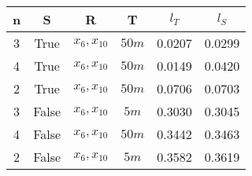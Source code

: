 \begin{tabular}{| c c | c c | c c |}
\hline
n & S & R & T & $l_T$ & $l_S$ \\
\hline
3 & True & $x_{6}, x_{10}$ & $50m$ & 0.0207 & 0.0299 \\
4 & True & $x_{6}, x_{10}$ & $50m$ & 0.0149 & 0.0420 \\
2 & True & $x_{6}, x_{10}$ & $50m$ & 0.0706 & 0.0703 \\
3 & False & $x_{6}, x_{10}$ & $5m$ & 0.3030 & 0.3045 \\
4 & False & $x_{6}, x_{10}$ & $50m$ & 0.3442 & 0.3463 \\
2 & False & $x_{6}, x_{10}$ & $5m$ & 0.3582 & 0.3619 \\
\hline
\end{tabular}
